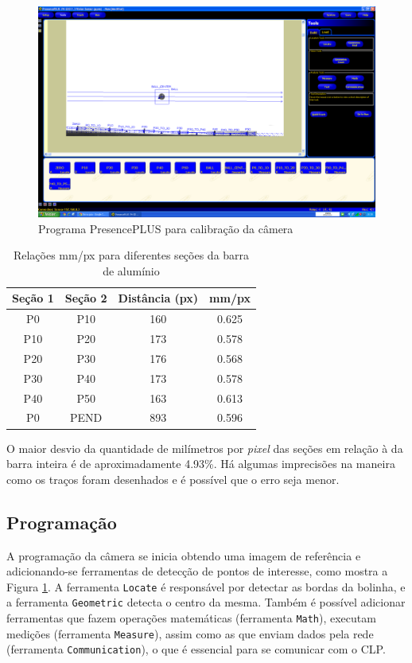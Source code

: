 \begin{figure}[!ht]
\centering
\includegraphics[width=0.9\linewidth]{figs/resultados/camera/programa}
\caption{Programa PresencePLUS para calibração da câmera \label{cameracalibracao}}
\end{figure}

\begin{table}[!ht]
\centering
\caption{Relações mm/px para diferentes seções da barra de alumínio \label{relacoesmmpx}}
	\begin{tabular}{|c|c|c|c|}
	\hline
		Seção 1 & Seção 2 & Distância (px) & mm/px\\ \hline
		P0 & P10 & 160 & 0.625\\ \hline
		P10 & P20 & 173 & 0.578\\ \hline
		P20 & P30 & 176 & 0.568\\ \hline
		P30 & P40 & 173 & 0.578\\ \hline
		P40 & P50 & 163 & 0.613\\ \hline
		P0 & PEND & 893 & 0.596\\ \hline
	\end{tabular}
\end{table}

O maior desvio da quantidade de milímetros por \textit{pixel} das seções em relação à da barra inteira é de aproximadamente 4.93\%. Há algumas imprecisões na maneira como os traços foram desenhados e é possível que o erro seja menor.

\subsection{Programação}
A programação da câmera se inicia obtendo uma imagem de referência e adicionando-se ferramentas de detecção de pontos de interesse, como mostra a Figura \ref{cameracalibracao}. A ferramenta \texttt{Locate} é responsável por detectar as bordas da bolinha, e a ferramenta \texttt{Geometric} detecta o centro da mesma. Também é possível adicionar ferramentas que fazem operações matemáticas (ferramenta \texttt{Math}), executam medições (ferramenta \texttt{Measure}), assim como as que enviam dados pela rede (ferramenta \texttt{Communication}), o que é essencial para se comunicar com o CLP.

